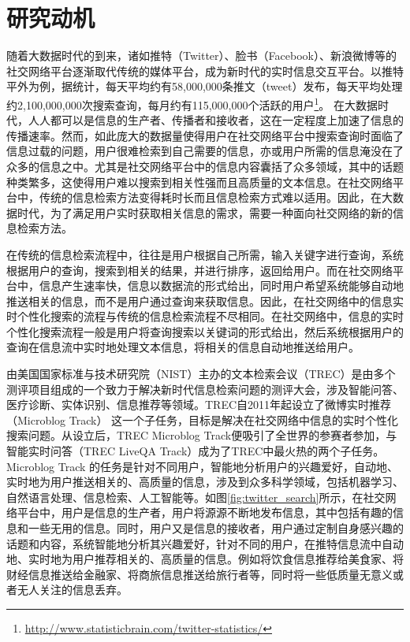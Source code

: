 \section{研究动机}
\label{sec2:motivation}
随着大数据时代的到来，诸如推特（Twitter）、脸书（Facebook）、新浪微博等的社交网络平台逐渐取代传统的媒体平台，成为新时代的实时信息交互平台。以推特平外为例，据统计，每天平均约有58,000,000条推文（tweet）发布，每天平均处理约2,100,000,000次搜索查询，每月约有115,000,000个活跃的用户\footnote{\url{http://www.statisticbrain.com/twitter-statistics/}}。 在大数据时代，人人都可以是信息的生产者、传播者和接收者，这在一定程度上加速了信息的传播速率。然而，如此庞大的数据量使得用户在社交网络平台中搜索查询时面临了信息过载的问题，用户很难检索到自己需要的信息，亦或用户所需的信息淹没在了众多的信息之中。尤其是社交网络平台中的信息内容囊括了众多领域，其中的话题种类繁多，这使得用户难以搜索到相关性强而且高质量的文本信息。在社交网络平台中，传统的信息检索方法变得耗时长而且信息检索方式难以适用。因此，在大数据时代，为了满足用户实时获取相关信息的需求，需要一种面向社交网络的新的信息检索方法。

在传统的信息检索流程中，往往是用户根据自己所需，输入关键字进行查询，系统根据用户的查询，搜索到相关的结果，并进行排序，返回给用户。而在社交网络平台中，信息产生速率快，信息以数据流的形式给出，同时用户希望系统能够自动地推送相关的信息，而不是用户通过查询来获取信息。因此，在社交网络中的信息实时个性化搜索的流程与传统的信息检索流程不尽相同。在社交网络中，信息的实时个性化搜索流程一般是用户将查询搜索以关键词的形式给出，然后系统根据用户的查询在信息流中实时地处理文本信息，将相关的信息自动地推送给用户。

由美国国家标准与技术研究院（NIST）主办的文本检索会议（TREC）是由多个测评项目组成的一个致力于解决新时代信息检索问题的测评大会，涉及智能问答、医疗诊断、实体识别、信息推荐等领域。TREC自2011年起设立了微博实时推荐（Microblog Track） 这一个子任务，目标是解决在社交网络中信息的实时个性化搜索问题。从设立后，TREC Microblog Track便吸引了全世界的参赛者参加，与智能实时问答（TREC LiveQA Track）成为了TREC中最火热的两个子任务。Microblog Track 的任务是针对不同用户，智能地分析用户的兴趣爱好，自动地、实时地为用户推送相关的、高质量的信息，涉及到众多科学领域，包括机器学习、自然语言处理、信息检索、人工智能等。如图\ref{fig:twitter_search}所示，在社交网络平台中，用户是信息的生产者，用户将源源不断地发布信息，其中包括有趣的信息和一些无用的信息。同时，用户又是信息的接收者，用户通过定制自身感兴趣的话题和内容，系统智能地分析其兴趣爱好，针对不同的用户，在推特信息流中自动地、实时地为用户推荐相关的、高质量的信息。例如将饮食信息推荐给美食家、将财经信息推送给金融家、将商旅信息推送给旅行者等，同时将一些低质量无意义或者无人关注的信息丢弃。

